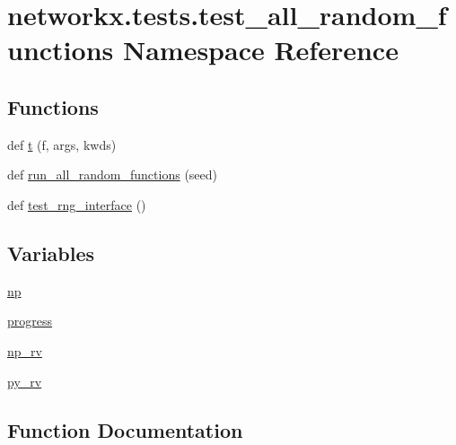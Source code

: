 \hypertarget{namespacenetworkx_1_1tests_1_1test__all__random__functions}{}\section{networkx.\+tests.\+test\+\_\+all\+\_\+random\+\_\+functions Namespace Reference}
\label{namespacenetworkx_1_1tests_1_1test__all__random__functions}
\subsection*{Functions}
\begin{DoxyCompactItemize}
\item 
def \hyperlink{namespacenetworkx_1_1tests_1_1test__all__random__functions_ababe97c11b5ff9b1ab5d60c08f6a84ff}{t} (f, args, kwds)
\item 
def \hyperlink{namespacenetworkx_1_1tests_1_1test__all__random__functions_ae5d1c2271cc34441d2024829d5794e5f}{run\+\_\+all\+\_\+random\+\_\+functions} (seed)
\item 
def \hyperlink{namespacenetworkx_1_1tests_1_1test__all__random__functions_ac0f045a1f00a1c809a1a70270a675104}{test\+\_\+rng\+\_\+interface} ()
\end{DoxyCompactItemize}
\subsection*{Variables}
\begin{DoxyCompactItemize}
\item 
\hyperlink{namespacenetworkx_1_1tests_1_1test__all__random__functions_a34c9b2a0eb48ecf2c28f04fa1997e892}{np}
\item 
\hyperlink{namespacenetworkx_1_1tests_1_1test__all__random__functions_a72ed4c0f791d53540cf62b289096c790}{progress}
\item 
\hyperlink{namespacenetworkx_1_1tests_1_1test__all__random__functions_ae981549d8d9e0018185103dbdf03d88f}{np\+\_\+rv}
\item 
\hyperlink{namespacenetworkx_1_1tests_1_1test__all__random__functions_a8cebf331797f5fa9819d3bf18fb244ea}{py\+\_\+rv}
\end{DoxyCompactItemize}


\subsection{Function Documentation}
\mbox{\label{namespacenetworkx_1_1tests_1_1test__all__random__functions_ae5d1c2271cc34441d2024829d5794e5f}} 
